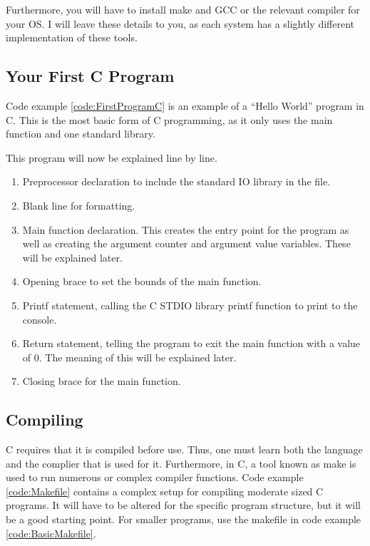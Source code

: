 			Furthermore, you will have to install make and GCC or the relevant compiler for your OS. 
			I will leave these details to you, as each system has a slightly different implementation of these tools. 

		\subsection{Your First C Program}
			Code example \ref{code:FirstProgramC} is an example of a ``Hello World'' program in C. 
			This is the most basic form of C programming, as it only uses the main function and one standard library. 
			\begin{code}
				C}]{./first.c}
				\caption{A Simple Hello World Program in C}
				\label{code:FirstProgramC}
			\end{code}
			This program will now be explained line by line. 
			\begin{enumerate}
				\item Preprocessor declaration to include the standard IO library in the file. 
				\item Blank line for formatting. 
				\item Main function declaration. 
					This creates the entry point for the program as well as creating the argument counter and argument value variables. 
					These will be explained later. 
				\item Opening brace to set the bounds of the main function. 
				\item Printf statement, calling the C STDIO library printf function to print to the console. 
				\item Return statement, telling the program to exit the main function with a value of 0. 
					The meaning of this will be explained later. 
				\item Closing brace for the main function. 
			\end{enumerate}
		\subsection{Compiling}
			C requires that it is compiled before use. 
			Thus, one must learn both the language and the complier that is used for it. 
			Furthermore, in C, a tool known as make is used to run numerous or complex compiler functions. 
			Code example \ref{code:Makefile} contains a complex setup for compiling moderate sized C programs. 
			It will have to be altered for the specific program structure, but it will be a good starting point. 
			For smaller programs, use the makefile in code example \ref{code:BasicMakefile}.

